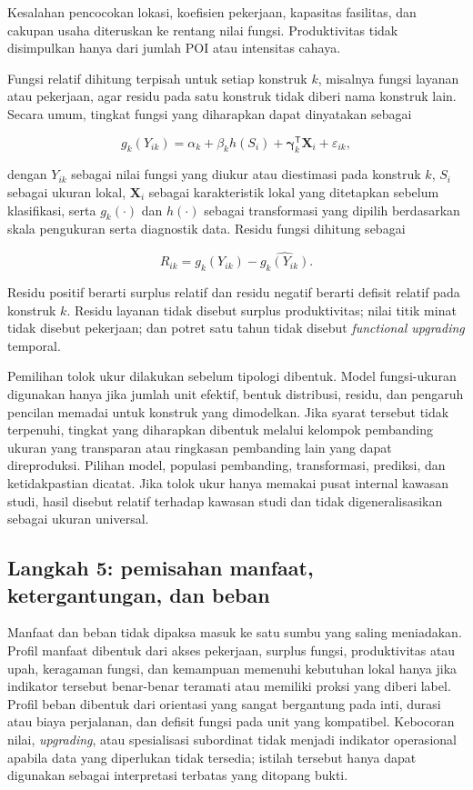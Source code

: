\documentclass[11pt,a4paper,oneside,openany,indonesian]{report}
\begin{document}
Kesalahan pencocokan lokasi, koefisien pekerjaan, kapasitas fasilitas,
dan cakupan usaha diteruskan ke rentang nilai fungsi. Produktivitas
tidak disimpulkan hanya dari jumlah POI atau intensitas cahaya.

Fungsi relatif dihitung terpisah untuk setiap konstruk \(k\), misalnya
fungsi layanan atau pekerjaan, agar residu pada satu konstruk tidak
diberi nama konstruk lain. Secara umum, tingkat fungsi yang diharapkan
dapat dinyatakan sebagai

\[
g_k(Y_{ik}) = \alpha_k + \beta_k h(S_i) + \boldsymbol{\gamma}_k^{\mathsf T}\mathbf{X}_i + \varepsilon_{ik},
\]

dengan \(Y_{ik}\) sebagai nilai fungsi yang diukur atau diestimasi pada
konstruk \(k\), \(S_i\) sebagai ukuran lokal, \(\mathbf{X}_i\) sebagai
karakteristik lokal yang ditetapkan sebelum klasifikasi, serta
\(g_k(\cdot)\) dan \(h(\cdot)\) sebagai transformasi yang dipilih
berdasarkan skala pengukuran serta diagnostik data. Residu fungsi
dihitung sebagai

\[
R_{ik}=g_k(Y_{ik})-\widehat{g_k(Y_{ik})}.
\]

Residu positif berarti surplus relatif dan residu negatif berarti
defisit relatif pada konstruk \(k\). Residu layanan tidak disebut
surplus produktivitas; nilai titik minat tidak disebut pekerjaan; dan
potret satu tahun tidak disebut \emph{functional upgrading} temporal.

Pemilihan tolok ukur dilakukan sebelum tipologi dibentuk. Model
fungsi-ukuran digunakan hanya jika jumlah unit efektif, bentuk
distribusi, residu, dan pengaruh pencilan memadai untuk konstruk yang
dimodelkan. Jika syarat tersebut tidak terpenuhi, tingkat yang
diharapkan dibentuk melalui kelompok pembanding ukuran yang transparan
atau ringkasan pembanding lain yang dapat direproduksi. Pilihan model,
populasi pembanding, transformasi, prediksi, dan ketidakpastian dicatat.
Jika tolok ukur hanya memakai pusat internal kawasan studi, hasil
disebut relatif terhadap kawasan studi dan tidak digeneralisasikan
sebagai ukuran universal.

\subsection{Langkah 5: pemisahan manfaat, ketergantungan, dan
beban}\label{langkah-5-pemisahan-manfaat-ketergantungan-dan-beban}

Manfaat dan beban tidak dipaksa masuk ke satu sumbu yang saling
meniadakan. Profil manfaat dibentuk dari akses pekerjaan, surplus
fungsi, produktivitas atau upah, keragaman fungsi, dan kemampuan
memenuhi kebutuhan lokal hanya jika indikator tersebut benar-benar
teramati atau memiliki proksi yang diberi label. Profil beban dibentuk
dari orientasi yang sangat bergantung pada inti, durasi atau biaya
perjalanan, dan defisit fungsi pada unit yang kompatibel. Kebocoran
nilai, \emph{upgrading}, atau spesialisasi subordinat tidak menjadi
indikator operasional apabila data yang diperlukan tidak tersedia;
istilah tersebut hanya dapat digunakan sebagai interpretasi terbatas
yang ditopang bukti.
\end{document}
